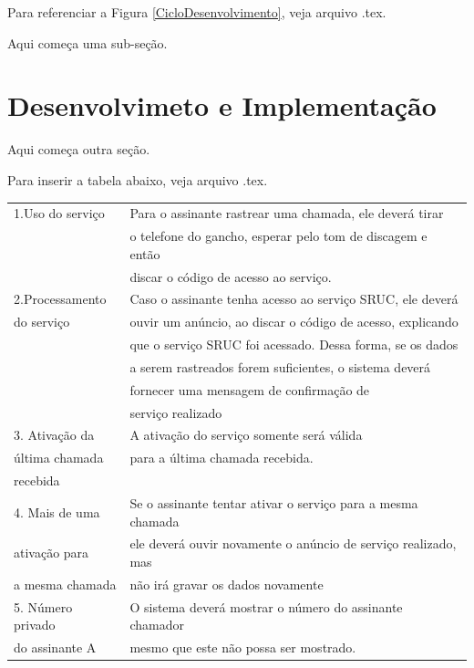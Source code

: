 Para referenciar a Figura \ref{CicloDesenvolvimento}, veja arquivo .tex.



Aqui começa uma sub-seção.


\section{Desenvolvimeto e Implementação}

Aqui começa outra seção.

Para inserir a tabela abaixo, veja arquivo .tex.

\begin{table}
\centering
\begin{tabular}{|l|l|}\hline
		1.Uso do serviço & Para o assinante rastrear uma chamada, ele deverá tirar\\ 
										 & o telefone do gancho, esperar pelo tom de discagem e então \\
										 & discar o código de acesso ao serviço. \\ \hline
		2.Processamento  & Caso o assinante tenha acesso ao serviço SRUC, ele deverá  \\			
		  do serviço 		 & ouvir um anúncio, ao discar o código de acesso, explicando \\
									   & que o serviço SRUC foi acessado. Dessa forma, se os dados \\
									   & a serem rastreados forem suficientes, o sistema deverá \\
									   & fornecer uma mensagem de confirmação de \\
									   & serviço realizado \\ \hline
		3. Ativação da   		& A ativação do serviço somente será válida \\
			 última chamada   & para a última chamada recebida. \\ 
			 recebida				 	& \\ \hline
		4. Mais de uma   		& Se o assinante tentar ativar o serviço para a mesma chamada \\
			 ativação para 	 	& ele deverá ouvir novamente o anúncio de serviço realizado, mas \\
			 a mesma chamada	& não irá gravar os dados novamente \\ \hline
		5. Número privado 	& O sistema deverá mostrar o número do assinante chamador \\
			 do assinante A  	& mesmo que este não possa ser mostrado. \\ \hline

\end{tabular}
\end{table}
